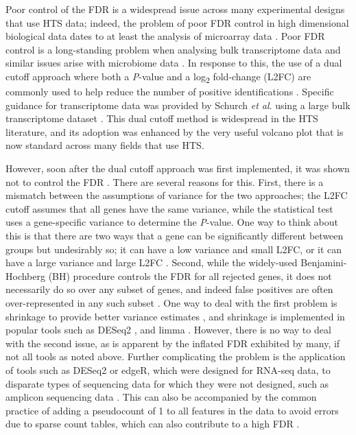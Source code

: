 \documentclass[10pt,letterpaper]{article}
\begin{document}
Poor control of the FDR is a widespread issue across many experimental designs that use HTS data; indeed, the problem of poor FDR control in high dimensional biological data dates to at least the analysis of microarray data \cite{Cui:2003aa}. Poor FDR control is a long-standing problem when analysing bulk transcriptome data \cite{Soneson:2013, li_exaggerated_2022} and similar issues arise with microbiome data \cite{hawinkel2017, Nearing:2022aa}. In response to this, the use of a dual cutoff approach where both a \textit{P}-value and a log\textsubscript{2} fold-change (L2FC) are commonly used to help reduce the number of positive identifications \cite{Cui:2003aa}. Specific guidance for transcriptome data was provided by Schurch \textit{et al}. using a large bulk transcriptome dataset \cite{schurch_how_2016}. This dual cutoff method is widespread in the HTS literature, and its adoption was enhanced by the very useful volcano plot \cite{Cui:2003aa} that is now standard across many fields that use HTS.

However, soon after the dual cutoff approach was first implemented, it was shown not to control the FDR \cite{witten2007comparison, Zhang:2009aa}. There are several reasons for this. First, there is a mismatch between the assumptions of variance for the two approaches; the L2FC cutoff assumes that all genes have the same variance, while the statistical test uses a gene-specific variance to determine the \textit{P}-value. One way to think about this is that there are two ways that a gene can be significantly different between groups but undesirably so; it can have a low variance and small L2FC, or it can have a large variance and large L2FC \cite{ebrahimpoor_inflated_2021}. Second, while the widely-used Benjamini-Hochberg \cite{benjamini:1995} (BH) procedure controls the FDR for all rejected genes, it does not necessarily do so over any subset of genes, and indeed false positives are often over-represented in any such subset \cite{Goeman:2014aa, ebrahimpoor_inflated_2021}. One way to deal with the first problem is shrinkage to provide better variance estimates \cite{Zhang:2009aa}, and shrinkage is implemented in popular tools such as DESeq2 \cite{love_moderated_2014}, and limma \cite{ritchie_limma_2015}. However, there is no way to deal with the second issue, as is apparent by the inflated FDR exhibited by many, if not all tools as noted above. Further complicating the problem is the application of tools such as DESeq2 or edgeR, which were designed for RNA-seq data, to disparate types of sequencing data for which they were not designed, such as amplicon sequencing data \cite{Nearing:2022aa, regueira-iglesias_critical_2023, yang_comprehensive_2022}. This can also be accompanied by the common practice of adding a pseudocount of 1 to all features in the data to avoid errors due to sparse count tables, which can also contribute to a high FDR \cite{weiss_normalization_2017}.
\end{document}
